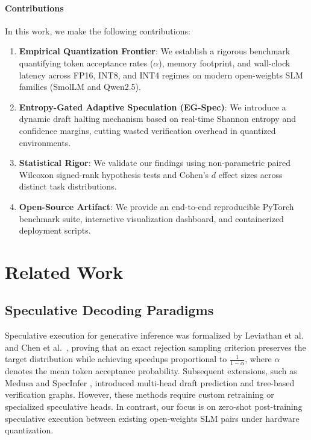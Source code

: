 \documentclass[10pt,twocolumn,letterpaper]{article}
\begin{document}
\paragraph{Contributions}
In this work, we make the following contributions:
\begin{enumerate}
    \item \textbf{Empirical Quantization Frontier}: We establish a rigorous benchmark quantifying token acceptance rates ($\alpha$), memory footprint, and wall-clock latency across FP16, INT8, and INT4 regimes on modern open-weights SLM families (SmolLM and Qwen2.5).
    \item \textbf{Entropy-Gated Adaptive Speculation (EG-Spec)}: We introduce a dynamic draft halting mechanism based on real-time Shannon entropy and confidence margins, cutting wasted verification overhead in quantized environments.
    \item \textbf{Statistical Rigor}: We validate our findings using non-parametric paired Wilcoxon signed-rank hypothesis tests and Cohen's $d$ effect sizes across distinct task distributions.
    \item \textbf{Open-Source Artifact}: We provide an end-to-end reproducible PyTorch benchmark suite, interactive visualization dashboard, and containerized deployment scripts.
\end{enumerate}

\section{Related Work}

\subsection{Speculative Decoding Paradigms}
Speculative execution for generative inference was formalized by Leviathan et al.~\cite{leviathan2023fast} and Chen et al.~\cite{chen2023accelerating}, proving that an exact rejection sampling criterion preserves the target distribution while achieving speedups proportional to $\frac{1}{1 - \alpha}$, where $\alpha$ denotes the mean token acceptance probability. Subsequent extensions, such as Medusa \cite{cai2024medusa} and SpecInfer \cite{miao2024specinfer}, introduced multi-head draft prediction and tree-based verification graphs. However, these methods require custom retraining or specialized speculative heads. In contrast, our focus is on zero-shot post-training speculative execution between existing open-weights SLM pairs under hardware quantization.
\end{document}
